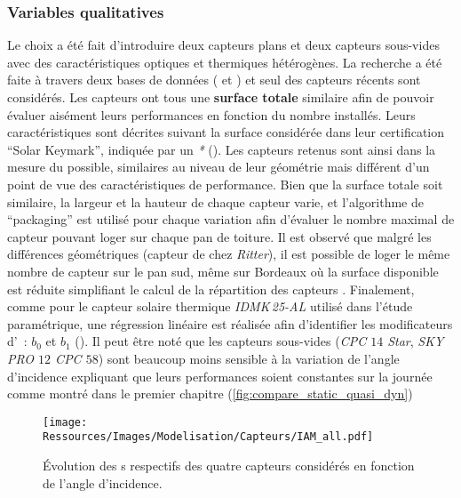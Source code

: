 \subsubsection{Variables qualitatives} %
\label{ssub:variables_qualitatives}
Le choix a été fait d’introduire deux capteurs plans et deux capteurs sous-vides avec
des caractéristiques optiques et thermiques hétérogènes. La recherche a été faite
à travers deux bases de données ( et
) et seul des capteurs récents sont considérés.
Les capteurs ont tous une \textbf{surface totale} similaire afin de pouvoir évaluer
aisément leurs performances en fonction du nombre installés. Leurs caractéristiques
sont décrites suivant la surface considérée dans leur certification \enquote{Solar Keymark},
indiquée par un \emph{*} (). Les capteurs
retenus sont ainsi dans la mesure du possible, similaires au niveau de leur  géométrie
mais différent d’un point de vue des caractéristiques de performance. Bien que
la surface totale soit similaire, la largeur et la hauteur de chaque capteur varie, et
l’algorithme de \enquote{packaging} est utilisé pour chaque variation afin d’évaluer le
nombre maximal de capteur pouvant loger sur chaque pan de toiture. Il est observé que
malgré les différences géométriques (capteur de chez \textit{Ritter}), il est possible de
loger le même nombre de capteur sur le pan sud, même sur Bordeaux où la surface disponible
est réduite simplifiant le calcul de la répartition des capteurs .
Finalement, comme pour le capteur solaire thermique \textit{IDMK\,25-AL} utilisé dans
l’étude paramétrique, une régression linéaire est réalisée afin d’identifier les
modificateurs d’~: $b_{0}$ et $b_{1}$ (). Il peut
être noté que les capteurs sous-vides (\textit{CPC $14$ Star}, \textit{SKY PRO $12$ CPC
$58$}) sont beaucoup moins sensible à la variation de l’angle d’incidence expliquant que
leurs performances soient constantes sur la journée comme montré dans le premier chapitre
(\ref{fig:compare_static_quasi_dyn})

\begin{figure}
    \centering
    \texttt{[image: Ressources/Images/Modelisation/Capteurs/IAM\_all.pdf]}
    \caption[Évolution des s en fonction de l’angle d’incidence]
    {Évolution des s respectifs des quatre capteurs considérés en fonction
     de l’angle d’incidence.}
    \label{fig:correlation_IAM_all}
\end{figure}

